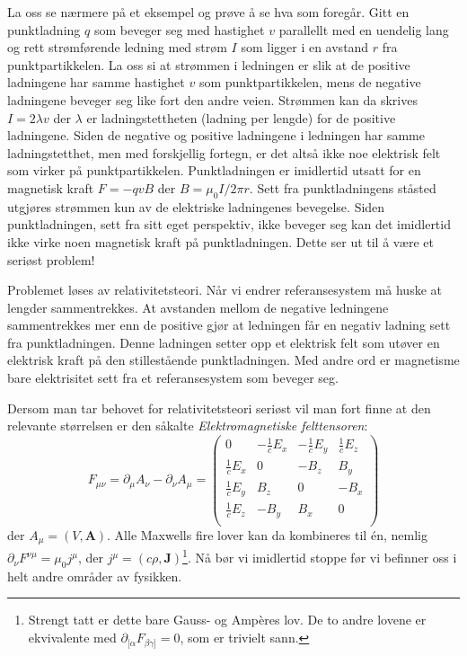 \documentclass[twoside,utf8]{article}
\begin{document}
  La oss se nærmere på et eksempel og prøve å se hva som foregår. Gitt en punktladning $q$ som beveger seg med hastighet $v$ parallellt med en uendelig lang og rett strømførende ledning med strøm $I$ som ligger i en avstand $r$ fra punktpartikkelen. La oss si at strømmen i ledningen er slik at de positive ladningene har samme hastighet $v$ som punktpartikkelen, mens de negative ladningene beveger seg like fort den andre veien. Strømmen kan da skrives $I=2\lambda v$ der $\lambda$ er ladningstettheten (ladning per lengde) for de positive ladningene. Siden de negative og positive ladningene i ledningen har samme ladningstetthet, men med forskjellig fortegn, er det altså ikke noe elektrisk felt som virker på punktpartikkelen. Punktladningen er imidlertid utsatt for en magnetisk kraft $F=-qvB$ der $B=\mu_0I/2\pi r$. Sett fra punktladningens ståsted utgjøres strømmen kun av de elektriske ladningenes bevegelse. Siden punktladningen, sett fra sitt eget perspektiv, ikke beveger seg kan det imidlertid ikke virke noen magnetisk kraft på punktladningen. Dette ser ut til å være et seriøst problem!


  Problemet løses av relativitetsteori. Når vi endrer referansesystem må huske at lengder sammentrekkes. At avstanden mellom de negative ledningene sammentrekkes mer enn de positive gjør at ledningen får en negativ ladning sett fra punktladningen. Denne ladningen setter opp et elektrisk felt som utøver en elektrisk kraft på den stillestående punktladningen. Med andre ord er magnetisme bare elektrisitet sett fra et referansesystem som beveger seg.


Dersom man tar behovet for relativitetsteori seriøst vil man fort finne at den relevante størrelsen er den såkalte {\it Elektromagnetiske felttensoren}:
\[
  F_{\mu\nu}=\partial_\mu A_\nu - \partial_\nu A_\mu
  =
  \left(\begin{matrix}
  0               & -\frac{1}{c}E_x     & -\frac{1}{c}E_y   & \frac{1}{c}E_z  \\
  \frac{1}{c}E_x  & 0                   & -B_z              & B_y             \\
  \frac{1}{c}E_y  & B_z                 & 0                 & -B_x            \\
  \frac{1}{c}E_z  & -B_y                & B_x               & 0               \\
  \end{matrix}\right)
\]
der $A_\mu = (V,\mathbf{A})$. Alle Maxwells fire lover kan da kombineres til én, nemlig $\partial_\nu F^{\nu\mu} = \mu_0 j^\mu$, der $j^\mu = (c\rho,\mathbf{J})$\footnote{Strengt tatt er dette bare Gauss- og Ampères lov. De to andre lovene er ekvivalente med $\partial_{[\alpha}F_{\beta \gamma]}=0$, som er trivielt sann. }. Nå bør vi imidlertid stoppe før vi befinner oss i helt andre områder av fysikken.
\end{document}
